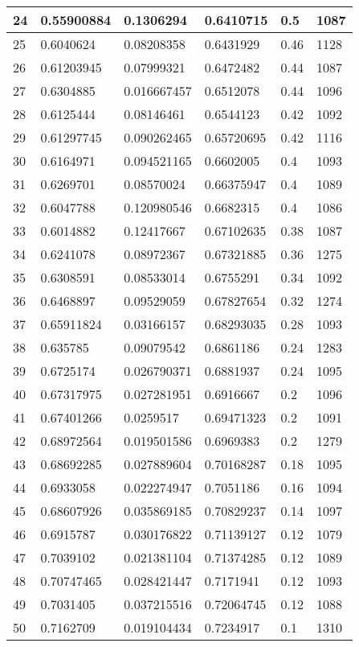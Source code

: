 \begin{longtable}{|l|l|l|l|l|l|}
24 & 0.55900884 & 0.1306294 & 0.6410715 & 0.5 & 1087 \\ \hline 
25 & 0.6040624 & 0.08208358 & 0.6431929 & 0.46 & 1128 \\ \hline 
26 & 0.61203945 & 0.07999321 & 0.6472482 & 0.44 & 1087 \\ \hline 
27 & 0.6304885 & 0.016667457 & 0.6512078 & 0.44 & 1096 \\ \hline 
28 & 0.6125444 & 0.08146461 & 0.6544123 & 0.42 & 1092 \\ \hline 
29 & 0.61297745 & 0.090262465 & 0.65720695 & 0.42 & 1116 \\ \hline 
30 & 0.6164971 & 0.094521165 & 0.6602005 & 0.4 & 1093 \\ \hline 
31 & 0.6269701 & 0.08570024 & 0.66375947 & 0.4 & 1089 \\ \hline 
32 & 0.6047788 & 0.120980546 & 0.6682315 & 0.4 & 1086 \\ \hline 
33 & 0.6014882 & 0.12417667 & 0.67102635 & 0.38 & 1087 \\ \hline 
34 & 0.6241078 & 0.08972367 & 0.67321885 & 0.36 & 1275 \\ \hline 
35 & 0.6308591 & 0.08533014 & 0.6755291 & 0.34 & 1092 \\ \hline 
36 & 0.6468897 & 0.09529059 & 0.67827654 & 0.32 & 1274 \\ \hline 
37 & 0.65911824 & 0.03166157 & 0.68293035 & 0.28 & 1093 \\ \hline 
38 & 0.635785 & 0.09079542 & 0.6861186 & 0.24 & 1283 \\ \hline 
39 & 0.6725174 & 0.026790371 & 0.6881937 & 0.24 & 1095 \\ \hline 
40 & 0.67317975 & 0.027281951 & 0.6916667 & 0.2 & 1096 \\ \hline 
41 & 0.67401266 & 0.0259517 & 0.69471323 & 0.2 & 1091 \\ \hline 
42 & 0.68972564 & 0.019501586 & 0.6969383 & 0.2 & 1279 \\ \hline 
43 & 0.68692285 & 0.027889604 & 0.70168287 & 0.18 & 1095 \\ \hline 
44 & 0.6933058 & 0.022274947 & 0.7051186 & 0.16 & 1094 \\ \hline 
45 & 0.68607926 & 0.035869185 & 0.70829237 & 0.14 & 1097 \\ \hline 
46 & 0.6915787 & 0.030176822 & 0.71139127 & 0.12 & 1079 \\ \hline 
47 & 0.7039102 & 0.021381104 & 0.71374285 & 0.12 & 1089 \\ \hline 
48 & 0.70747465 & 0.028421447 & 0.7171941 & 0.12 & 1093 \\ \hline 
49 & 0.7031405 & 0.037215516 & 0.72064745 & 0.12 & 1088 \\ \hline 
50 & 0.7162709 & 0.019104434 & 0.7234917 & 0.1 & 1310 \\ \hline 
\end{longtable}